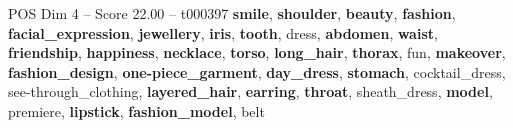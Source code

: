 \begin{textsample}{POS Dim 4 – Score 22.00 – t000397}  \label{ex:f4_pos_016}
\textbf{smile}, \textbf{shoulder}, \textbf{beauty}, \textbf{fashion}, \textbf{facial\_expression}, \textbf{jewellery}, \textbf{iris}, \textbf{tooth}, dress, \textbf{abdomen}, \textbf{waist}, \textbf{friendship}, \textbf{happiness}, \textbf{necklace}, \textbf{torso}, \textbf{long\_hair}, \textbf{thorax}, fun, \textbf{makeover}, \textbf{fashion\_design}, \textbf{one-piece\_garment}, \textbf{day\_dress}, \textbf{stomach}, cocktail\_dress, see-through\_clothing, \textbf{layered\_hair}, \textbf{earring}, \textbf{throat}, sheath\_dress, \textbf{model}, premiere, \textbf{lipstick}, \textbf{fashion\_model}, belt

\end{textsample}
